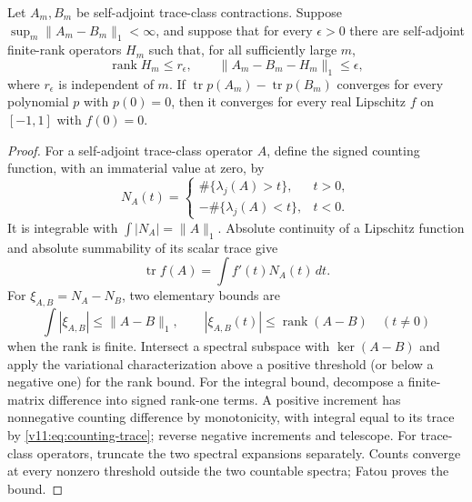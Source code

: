 \begin{lemma}
\label{v11:lem:lip-tightness}
Let $A_m,B_m$ be self-adjoint trace-class contractions.  Suppose
$\sup_m\|A_m-B_m\|_1<\infty$, and suppose that for every $\epsilon>0$
there are self-adjoint finite-rank operators $H_m$ such that, for all
sufficiently large $m$,
\[
 \operatorname{rank}H_m\le r_\epsilon,\qquad
 \|A_m-B_m-H_m\|_1\le\epsilon,
\]
where $r_\epsilon$ is independent of $m$.
If $\operatorname{tr}p(A_m)-\operatorname{tr}p(B_m)$ converges for every
polynomial $p$ with $p(0)=0$, then it converges for every real Lipschitz
$f$ on $[-1,1]$ with $f(0)=0$.
\end{lemma}
\begin{proof}
For a self-adjoint trace-class operator $A$, define the signed counting
function, with an immaterial value at zero, by
\[
 N_A(t)=\begin{cases}
 \#\{\lambda_j(A)>t\},&t>0,\\
 -\#\{\lambda_j(A)<t\},&t<0.
 \end{cases}
\]
It is integrable with $\int|N_A|=\|A\|_1$.  Absolute continuity of a
Lipschitz function and absolute summability of its scalar trace give
\begin{equation}\label{v11:eq:counting-trace}
 \operatorname{tr}f(A)=\int f'(t)N_A(t)\,dt.
\end{equation}
For $\xi_{A,B}=N_A-N_B$, two elementary bounds are
\begin{equation}\label{v11:eq:counting-shift-bounds}
 \int|\xi_{A,B}|\le\|A-B\|_1,
 \qquad
 |\xi_{A,B}(t)|\le\operatorname{rank}(A-B)\quad(t\ne0)
\end{equation}
when the rank is finite. Intersect a spectral subspace with
$\ker(A-B)$ and apply the variational characterization above a positive
threshold (or below a negative one) for the rank bound. For the integral
bound, decompose a finite-matrix difference into signed rank-one terms.
A positive increment has nonnegative counting difference by monotonicity,
with integral equal to its trace by \eqref{v11:eq:counting-trace}; reverse
negative increments and telescope. For trace-class operators, truncate
the two spectral expansions separately. Counts converge at every nonzero
threshold outside the two countable spectra; Fatou proves the bound.


\end{proof}
